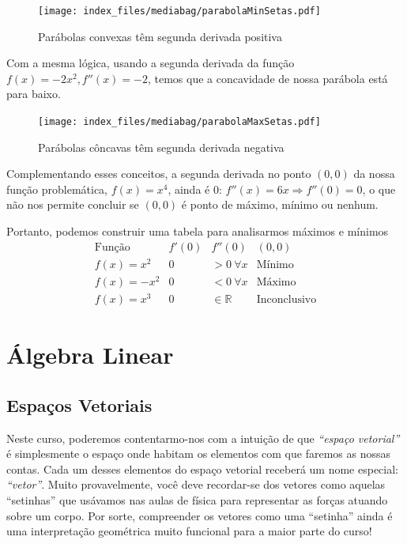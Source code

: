 \documentclass[
  portuguese,
  letterpaper,
  DIV=11,
  numbers=noendperiod]{scrreport}
\begin{document}
\begin{figure}[H]

\caption{Parábolas convexas têm segunda derivada positiva}

{\centering \texttt{[image: index\_files/mediabag/parabolaMinSetas.pdf]}

}

\end{figure}%

Com a mesma lógica, usando a segunda derivada da função
\(f(x) = -2x^2, f''(x) = -2\), temos que a concavidade de nossa parábola
está para baixo.

\begin{figure}[H]

\caption{Parábolas côncavas têm segunda derivada negativa}

{\centering \texttt{[image: index\_files/mediabag/parabolaMaxSetas.pdf]}

}

\end{figure}%

Complementando esses conceitos, a segunda derivada no ponto \((0,0)\) da
nossa função problemática, \(f(x) = x^4\), ainda é 0:
\(f''(x) = 6x \Rightarrow f''(0) =0\), o que não nos permite concluir se
\((0,0)\) é ponto de máximo, mínimo ou nenhum.

Portanto, podemos construir uma tabela para analisarmos máximos e
mínimos \[
\begin{array}{c|c|c|c}
    \text{Função} & f'(0) & f''(0) & (0,0) \\
    \hline
    f(x) = x^2 &  0 &  > 0 ~\forall x & \text{Mínimo} \\
    f(x) = -x^2 &  0 &  < 0 ~\forall x & \text{Máximo} \\
    f(x) = x^3 &  0 &  \in \mathbb{R} & \text{Inconclusivo} 
\end{array}
\]

\part{Álgebra Linear}

\chapter{Espaços Vetoriais}\label{espauxe7os-vetoriais}

Neste curso, poderemos contentarmo-nos com a intuição de que
\emph{``espaço vetorial''} é simplesmente o espaço onde habitam os
elementos com que faremos as nossas contas. Cada um desses elementos do
espaço vetorial receberá um nome especial: \emph{``vetor''}. Muito
provavelmente, você deve recordar-se dos vetores como aquelas
``setinhas'' que usávamos nas aulas de física para representar as forças
atuando sobre um corpo. Por sorte, compreender os vetores como uma
``setinha'' ainda é uma interpretação geométrica muito funcional para a
maior parte do curso!
\end{document}
